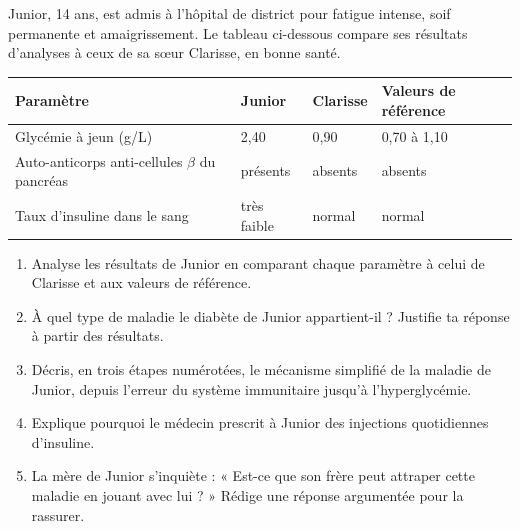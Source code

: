 \documentclass[11pt]{article}
\begin{document}
\begin{exercice}
Junior, 14 ans, est admis à l'hôpital de district pour fatigue intense, soif permanente et amaigrissement. Le tableau ci-dessous compare ses résultats d'analyses à ceux de sa sœur Clarisse, en bonne santé.

\begin{center}
\begin{tabularx}{\linewidth}{|l|X|X|X|}\hline
\rowcolor{popblueL} \textbf{Paramètre} & \textbf{Junior} & \textbf{Clarisse} & \textbf{Valeurs de référence} \\ \hline
Glycémie à jeun (g/L) & 2,40 & 0,90 & 0,70 à 1,10 \\ \hline
Auto-anticorps anti-cellules $\beta$ du pancréas & présents & absents & absents \\ \hline
Taux d'insuline dans le sang & très faible & normal & normal \\ \hline
\end{tabularx}
\end{center}

\begin{enumerate}
\item Analyse les résultats de Junior en comparant chaque paramètre à celui de Clarisse et aux valeurs de référence.
\item À quel type de maladie le diabète de Junior appartient-il ? Justifie ta réponse à partir des résultats.
\item Décris, en trois étapes numérotées, le mécanisme simplifié de la maladie de Junior, depuis l'erreur du système immunitaire jusqu'à l'hyperglycémie.
\item Explique pourquoi le médecin prescrit à Junior des injections quotidiennes d'insuline.
\item La mère de Junior s'inquiète : « Est-ce que son frère peut attraper cette maladie en jouant avec lui ? » Rédige une réponse argumentée pour la rassurer.
\end{enumerate}
\end{exercice}
\end{document}

